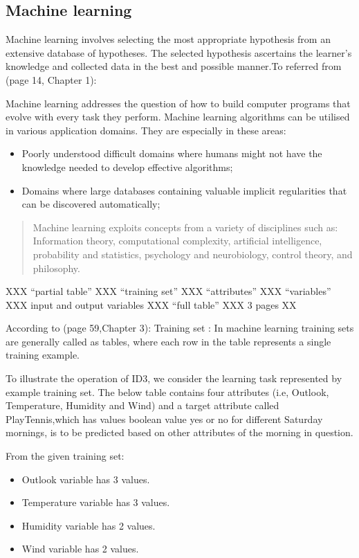 \documentclass{article}
\begin{document}
\subsection{Machine learning}
\label{sec:machinelearn}

Machine learning involves selecting the most appropriate hypothesis from an extensive database of hypotheses. The selected hypothesis ascertains the learner's knowledge and collected data in the best and possible manner.To referred  from \cite{Mitchell1997MachineLearning}(page 14, Chapter 1):

Machine learning addresses the question of how to build computer programs that evolve with every task they perform. Machine learning algorithms can be utilised in various application domains. They are especially in these areas: 
\begin{itemize}
\item Poorly understood difficult domains where humans might not have the knowledge needed to develop effective algorithms;
\item Domains where large databases containing valuable implicit regularities that can be discovered automatically;
\end{itemize}

\begin{quote}
Machine learning exploits concepts from a variety of disciplines such as: Information theory, computational complexity, artificial intelligence, probability and statistics, psychology and neurobiology, control theory, and philosophy.
\end{quote}

XXX ``partial table'' XXX ``training set'' XXX ``attributes'' XXX ``variables'' XXX input and output variables XXX ``full table'' XXX 3 pages XX


According to \cite{Mitchell1997MachineLearning}(page 59,Chapter 3): Training set : In machine learning training sets are generally called as tables, where each row in the table represents a single training example. 

To illustrate the operation of ID3, we consider the learning task represented by example training set.
The below table contains four attributes (i.e, Outlook, Temperature, Humidity and Wind) and a target attribute called PlayTennis,which has values boolean value yes or no for different Saturday mornings, is to be predicted based on other attributes of the morning in question.


From the given training set:
\begin{itemize}
\item Outlook variable has 3 values.
\item Temperature variable has 3 values.
\item Humidity variable has 2 values.
\item Wind variable has 2 values.
\end{itemize}
\end{document}
